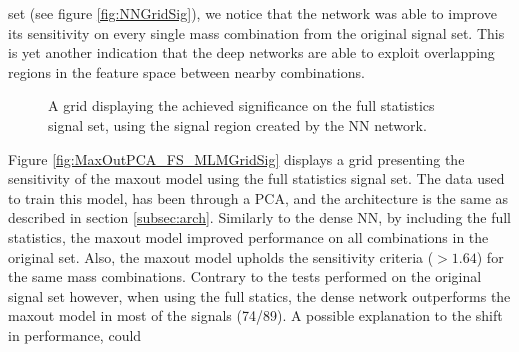 set (see figure \ref{fig:NNGridSig}), we notice that the network was able to improve its sensitivity on every single mass combination from the original signal set. This is yet another 
indication that the deep networks are able to exploit overlapping regions in the feature space between nearby combinations.\\
\begin{figure}
    \caption{A grid displaying the achieved significance on the full statistics signal set, using the signal region 
    created by the \ac{NN} network.}
    \label{fig:NN_FS_MLMGridSig}
\end{figure}
Figure \ref{fig:MaxOutPCA_FS_MLMGridSig} displays a grid presenting the sensitivity of the maxout model using the full statistics 
signal set. The data used to train this model, has been through a \ac{PCA}, and the architecture is the same as described in section \ref{subsec:arch}.
Similarly to the dense \ac{NN}, by including the full statistics, the maxout model improved performance on all combinations in the original set. 
Also, the maxout model upholds the sensitivity criteria ($>1.64$) for the same mass combinations. 
Contrary to the tests performed on the original signal set however, when using the full statics, the dense network 
outperforms the maxout model in most of the signals (74/89). A possible explanation to the shift in performance, could 
